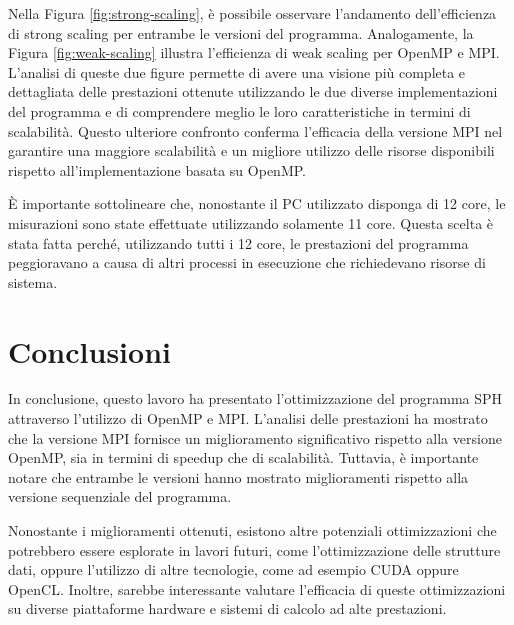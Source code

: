 \documentclass[a4paper,12pt, oneside]{article}
\begin{document}
Nella Figura \ref{fig:strong-scaling}, è possibile osservare l'andamento dell'efficienza di
strong scaling per entrambe le versioni del programma. Analogamente, la Figura \ref{fig:weak-scaling}
illustra l'efficienza di weak scaling per OpenMP e MPI. L'analisi di queste due figure
permette di avere una visione più completa e dettagliata delle prestazioni ottenute
utilizzando le due diverse implementazioni del programma e di comprendere meglio le loro
caratteristiche in termini di scalabilità. Questo ulteriore confronto conferma l'efficacia
della versione MPI nel garantire una maggiore scalabilità e un migliore utilizzo delle
risorse disponibili rispetto all'implementazione basata su OpenMP.

È importante sottolineare che, nonostante il PC utilizzato disponga di 12 core, le
misurazioni sono state effettuate utilizzando solamente 11 core. Questa scelta è stata
fatta perché, utilizzando tutti i 12 core, le prestazioni del programma peggioravano a
causa di altri processi in esecuzione che richiedevano risorse di sistema.

\section{Conclusioni}

In conclusione, questo lavoro ha presentato l'ottimizzazione del programma SPH attraverso
l'utilizzo di OpenMP e MPI. L'analisi delle prestazioni ha mostrato che la versione MPI
fornisce un miglioramento significativo rispetto alla versione OpenMP, sia in termini di
speedup che di scalabilità. Tuttavia, è importante notare che entrambe le
versioni hanno mostrato miglioramenti rispetto alla versione sequenziale del programma.

Nonostante i miglioramenti ottenuti, esistono altre potenziali ottimizzazioni che potrebbero
essere esplorate in lavori futuri, come l'ottimizzazione delle strutture dati, oppure
l'utilizzo di altre tecnologie, come ad esempio CUDA oppure OpenCL. Inoltre, sarebbe
interessante valutare l'efficacia di queste ottimizzazioni su diverse piattaforme hardware
e sistemi di calcolo ad alte prestazioni.
\end{document}
